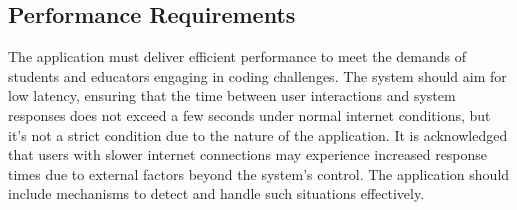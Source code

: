 \subsection{Performance Requirements}
The \app application must deliver efficient performance to meet the demands of students and educators engaging in coding challenges. The system should aim for low latency, ensuring that the time between user interactions and system responses does not exceed a few seconds under normal internet conditions, but it's not a strict condition due to the nature of the application. It is acknowledged that users with slower internet connections may experience increased response times due to external factors beyond the system's control. The application should include mechanisms to detect and handle such situations effectively. 

